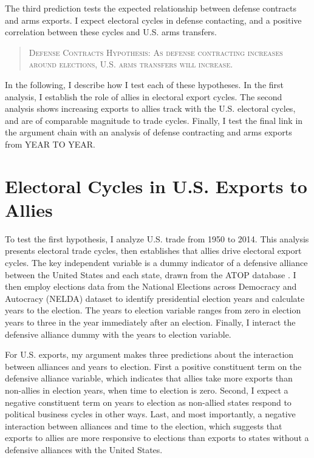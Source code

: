 \documentclass[12pt]{article}
\begin{document}
The third prediction tests the expected relationship between defense contracts and arms exports. 
I expect electoral cycles in defense contacting, and a positive correlation between these cycles and U.S. arms transfers.


\begin{quote}
\textsc{Defense Contracts Hypothesis: As defense contracting increases around elections, U.S. arms transfers will increase.}
\end{quote}



In the following, I describe how I test each of these hypotheses. 
In the first analysis, I establish the role of allies in electoral export cycles. 
The second analysis shows increasing exports to allies track with the U.S. electoral cycles, and are of comparable magnitude to trade cycles.
Finally, I test the final link in the argument chain with an analysis of defense contracting and arms exports from YEAR TO YEAR.




\section{Electoral Cycles in U.S. Exports to Allies}

To test the first hypothesis, I analyze U.S. trade from 1950 to 2014. 
This analysis presents electoral trade cycles, then establishes that allies drive electoral export cycles.
The key independent variable is a dummy indicator of a defensive alliance between the United States and each state, drawn from the ATOP database \citep{Leedsetal2002}.
I then employ elections data from the National Elections across Democracy and Autocracy (NELDA) dataset \citep{HydeMarinov2012} to identify presidential election years and calculate years to the election.
The years to election variable ranges from zero in election years to three in the year immediately after an election.
Finally, I interact the defensive alliance dummy with the years to election variable.


For U.S. exports, my argument makes three predictions about the interaction between alliances and years to election. 
First a positive constituent term on the defensive alliance variable, which indicates that allies take more exports than non-allies in election years, when time to election is zero.
Second, I expect a negative constituent term on years to election as non-allied states respond to political business cycles in other ways.
Last, and most importantly, a negative interaction between alliances and time to the election, which suggests that exports to allies are more responsive to elections than exports to states without a defensive alliances with the United States.
\end{document}
